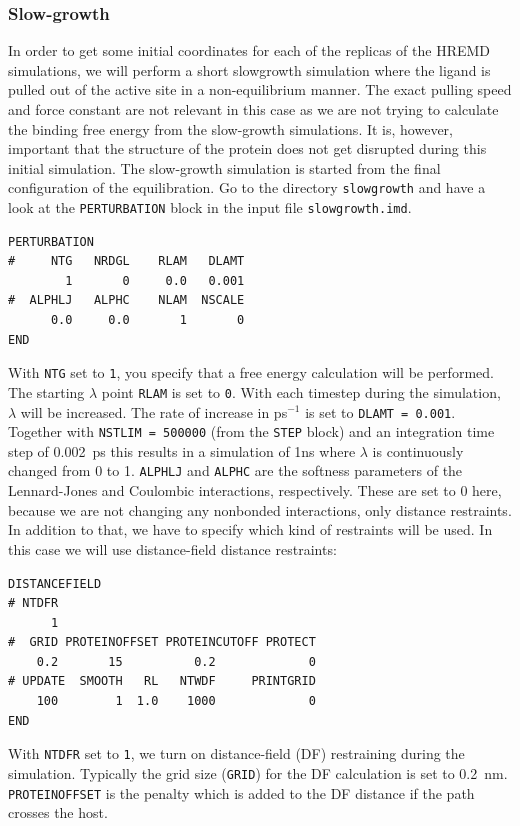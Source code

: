 \subsubsection{Slow-growth}
In order to get some initial coordinates for each of the replicas of the HREMD simulations, we will perform a short slowgrowth simulation where the ligand is pulled out of the active site in a non-equilibrium manner. 
The exact pulling speed and force constant are not relevant in this case as we are not trying to calculate the binding free energy from the slow-growth simulations. 
It is, however, important that the structure of the protein does not get disrupted during this initial simulation. 
The slow-growth simulation is started from the final configuration of the equilibration. 
Go to the directory \texttt{slowgrowth} and have a look at the \texttt{PERTURBATION} block in the input file \texttt{slowgrowth.imd}. 
\begin{lstlisting}
PERTURBATION
#     NTG   NRDGL    RLAM   DLAMT
        1       0     0.0   0.001
#  ALPHLJ   ALPHC    NLAM  NSCALE
      0.0     0.0       1       0
END
\end{lstlisting}
With \texttt{NTG} set to \texttt{1}, you specify that a free energy calculation will be performed. 
The starting $\lambda$ point \texttt{RLAM} is set to \texttt{0}. With each timestep during the simulation, $\lambda$ will be increased. The rate of increase in ps$^{-1}$ is set to \texttt{DLAMT = 0.001}. 
Together with \texttt{NSTLIM = 500000} (from the \texttt{STEP} block) and an integration time step of 0.002~ps this results in a simulation of 1ns where $\lambda$ is continuously changed from 0 to 1. 
\texttt{ALPHLJ} and \texttt{ALPHC} are the softness parameters of the Lennard-Jones and Coulombic interactions, respectively. 
These are set to 0 here, because we are not changing any nonbonded interactions, only distance restraints. 
In addition to that, we have to specify which kind of restraints will be used. In this case we will use distance-field distance restraints:
\begin{lstlisting}
DISTANCEFIELD
# NTDFR
      1
#  GRID PROTEINOFFSET PROTEINCUTOFF PROTECT
    0.2       15          0.2             0
# UPDATE  SMOOTH   RL   NTWDF     PRINTGRID
    100        1  1.0    1000             0
END
\end{lstlisting}
With \texttt{NTDFR} set to \texttt{1}, we turn on distance-field (DF) restraining during the simulation. Typically the grid size (\texttt{GRID}) for the DF calculation is set to 0.2~nm. 
\texttt{PROTEINOFFSET} is the penalty which is added to the DF distance if the path crosses the host. 
